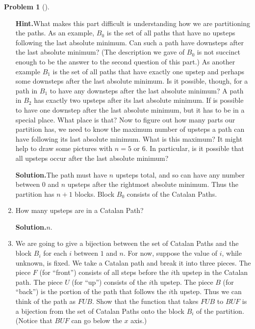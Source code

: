 \documentclass[10pt,]{book}
\theoremstyle{plain}
\theoremstyle{definition}
\newtheorem{activity}[project]{Problem}
\theoremstyle{definition}
\numberwithin{equation}{chapter}
\begin{document}
\begin{activity}[]
\begin{enumerate}[font=\bfseries,label=(\alph*),ref=\alph*]
\par\medskip\noindent%
\textbf{Hint.}\quad What makes this part difficult is understanding how we are partitioning the paths. As an example, \(B_0\) is the set of all paths that have no upsteps following the last absolute minimum. Can such a path have downsteps after the last absolute minimum? (The description we gave of \(B_0\) is not succinct enough to be the answer to the second question of this part.) As another example \(B_1\) is the set of all paths that have exactly one upstep and perhaps some downsteps after the last absolute minimum. Is it possible, though, for a path in \(B_1\) to have any downsteps after the last absolute minimum? A path in \(B_2\) has exactly two upsteps after its last absolute minimum. If is possible to have one downstep after the last absolute minimum, but it has to be in a special place. What place is that? Now to figure out how many parts our partition has, we need to know the maximum number of upsteps a path can have following its last absolute minimum. What is this maximum? It might help to draw some pictures with \(n = 5\) or \(6\). In particular, is it possible that all upsteps occur after the last absolute minimum?%
\par\medskip\noindent%
\textbf{Solution.}\quad The path must have \(n\) upsteps total, and so can have any number between 0 and \(n\) upsteps after the rightmost absolute minimum. Thus the partition has \(n+1\) blocks. Block \(B_0\) consists of the Catalan Paths.%
\item\label{task-58} How many upsteps are in a Catalan Path?%
\par\medskip\noindent%
\textbf{Solution.}\quad \(n\).%
\item\label{task-59} We are going to give a bijection between the set of Catalan Paths and the block \(B_i\) for each \(i\) between \(1\) and \(n\).  For now, suppose the value of \(i\), while unknown, is fixed.  We take a Catalan path and break it into three pieces.  The piece \(F\) (for ``front'') consists of all steps before the \(i\)th upstep in the Catalan path.  The piece \(U\) (for ``up'') consists of the \(i\)th upstep.  The piece \(B\) (for ``back'') is the portion of the path that follows the \(i\)th upstep.  Thus we can think of the path as \(FUB\).  Show that the function that takes \(FUB\) to \(BUF\) is a bijection from the set of Catalan Paths onto the block \(B_i\) of the partition.  (Notice that \(BUF\) can go below the \(x\) axis.)%
\par\medskip\noindent%

\end{enumerate}
\end{activity}
\end{document}

